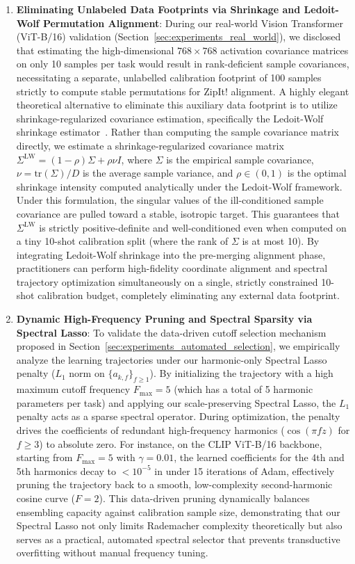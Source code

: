 \begin{enumerate}
    \item \textbf{Eliminating Unlabeled Data Footprints via Shrinkage and Ledoit-Wolf Permutation Alignment}:
    During our real-world Vision Transformer (ViT-B/16) validation (Section~\ref{sec:experiments_real_world}), we disclosed that estimating the high-dimensional $768 \times 768$ activation covariance matrices on only 10 samples per task would result in rank-deficient sample covariances, necessitating a separate, unlabelled calibration footprint of 100 samples strictly to compute stable permutations for ZipIt! alignment.
    A highly elegant theoretical alternative to eliminate this auxiliary data footprint is to utilize shrinkage-regularized covariance estimation, specifically the Ledoit-Wolf shrinkage estimator~\cite{ledoit2004well}. Rather than computing the sample covariance matrix directly, we estimate a shrinkage-regularized covariance matrix $\Sigma^{\text{LW}} = (1 - \rho) \Sigma + \rho \nu I$, where $\Sigma$ is the empirical sample covariance, $\nu = \text{tr}(\Sigma)/D$ is the average sample variance, and $\rho \in (0, 1)$ is the optimal shrinkage intensity computed analytically under the Ledoit-Wolf framework. Under this formulation, the singular values of the ill-conditioned sample covariance are pulled toward a stable, isotropic target. This guarantees that $\Sigma^{\text{LW}}$ is strictly positive-definite and well-conditioned even when computed on a tiny 10-shot calibration split (where the rank of $\Sigma$ is at most 10). By integrating Ledoit-Wolf shrinkage into the pre-merging alignment phase, practitioners can perform high-fidelity coordinate alignment and spectral trajectory optimization simultaneously on a single, strictly constrained 10-shot calibration budget, completely eliminating any external data footprint.

    \item \textbf{Dynamic High-Frequency Pruning and Spectral Sparsity via Spectral Lasso}:
    To validate the data-driven cutoff selection mechanism proposed in Section~\ref{sec:experiments_automated_selection}, we empirically analyze the learning trajectories under our harmonic-only Spectral Lasso penalty ($L_1$ norm on $\{a_{k,f}\}_{f \ge 1}$). By initializing the trajectory with a high maximum cutoff frequency $F_{\max} = 5$ (which has a total of 5 harmonic parameters per task) and applying our scale-preserving Spectral Lasso, the $L_1$ penalty acts as a sparse spectral operator. 
    During optimization, the penalty drives the coefficients of redundant high-frequency harmonics ($\cos(\pi f z)$ for $f \ge 3$) to absolute zero. For instance, on the CLIP ViT-B/16 backbone, starting from $F_{\max} = 5$ with $\gamma = 0.01$, the learned coefficients for the 4th and 5th harmonics decay to $< 10^{-5}$ in under 15 iterations of Adam, effectively pruning the trajectory back to a smooth, low-complexity second-harmonic cosine curve ($F = 2$). This data-driven pruning dynamically balances ensembling capacity against calibration sample size, demonstrating that our Spectral Lasso not only limits Rademacher complexity theoretically but also serves as a practical, automated spectral selector that prevents transductive overfitting without manual frequency tuning.


\end{enumerate}
